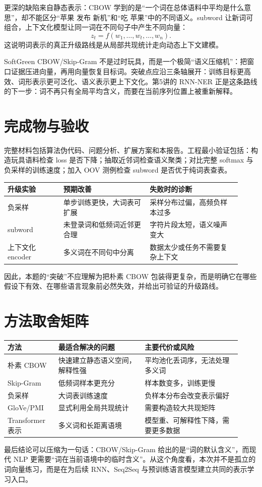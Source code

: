 \documentclass[UTF8,10pt,a4paper,fontset=none]{ctexart}
\begin{document}
更深的缺陷来自静态表示：CBOW 学到的是“一个词在总体语料中平均是什么意思”，却不能区分“苹果 发布 新机”和“吃 苹果”中的不同语义。subword 让新词可组合，上下文化模型让同一词在不同句子中产生不同向量：
\[
z_t=f(w_1,\ldots,w_t,\ldots,w_n).
\]
这说明词表示的真正升级路线是从局部共现统计走向动态上下文建模。

\begin{note}[创新性判断]{SoftGreen}
CBOW/Skip-Gram 不是过时玩具，而是一个极简“语义压缩机”：把窗口证据压进向量，再用向量恢复目标词。突破点应沿三条轴展开：训练目标更高效、词形表示更可泛化、语义表示更上下文化。第5讲的 RNN-NER 正是这条路线的下一步：词不再只有全局平均含义，而要在当前序列位置上被重新解释。
\end{note}

\section{完成物与验收}
完整材料包括算法伪代码、问题分析、扩展方案和本报告。工程最小验证包括：构造玩具语料检查 loss 是否下降；抽取近邻词检查语义聚类；对比完整 softmax 与负采样的训练速度；加入 OOV 测例检查 subword 是否优于纯词表查表。

\small
\begin{tabular}{@{}p{0.22\linewidth}p{0.34\linewidth}p{0.36\linewidth}@{}}
\toprule
升级实验 & 预期改善 & 失败时的诊断 \\
\midrule
负采样 & 单步训练更快，大词表可扩展 & 采样分布过偏，高频负样本过多 \\
subword & 未登录词和低频词近邻更合理 & 字符片段太短，语义噪声变大 \\
上下文化 encoder & 多义词在不同句中分离 & 数据太少或任务不需要复杂上下文 \\
\bottomrule
\end{tabular}
\normalsize

因此，本题的“突破”不应理解为把朴素 CBOW 包装得更复杂，而是明确它在哪些假设下有效、在哪些语言现象前必然失效，并给出可验证的升级路线。

\section{方法取舍矩阵}
\small
\begin{tabular}{@{}p{0.2\linewidth}p{0.34\linewidth}p{0.38\linewidth}@{}}
\toprule
方法 & 最适合解决的问题 & 主要代价或风险 \\
\midrule
朴素 CBOW & 快速建立静态语义空间，解释性强 & 平均池化丢词序，无法处理多义词 \\
Skip-Gram & 低频词样本更充分 & 样本数变多，训练更慢 \\
负采样 & 大词表训练速度 & 负样本分布会改变表示偏好 \\
GloVe/PMI & 显式利用全局共现统计 & 需要构造较大共现矩阵 \\
Transformer 表示 & 多义词和长距离语境 & 模型重、可解释性下降，需要更多数据 \\
\bottomrule
\end{tabular}
\normalsize

最后结论可以压缩为一句话：CBOW/Skip-Gram 给出的是“词的默认含义”，而现代 NLP 更需要“词在当前语境中的临时含义”。从这个角度看，本次并不是孤立的词向量练习，而是在为后续 RNN、Seq2Seq 与预训练语言模型建立共同的表示学习入口。
\end{document}

